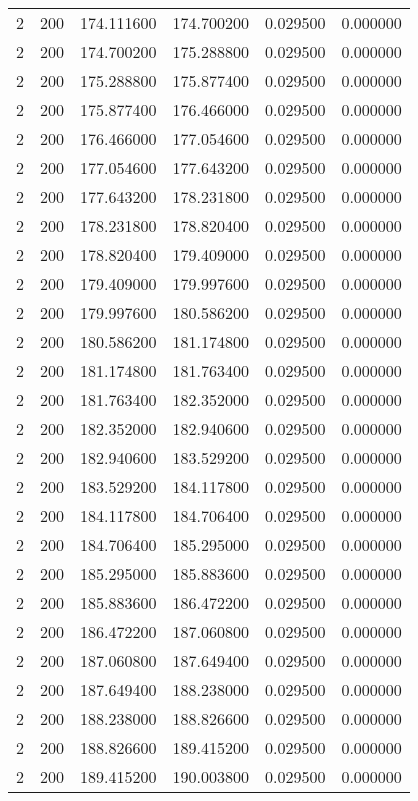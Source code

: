 \begin{longtable}{rrrrrr}
2 & 200 & 174.111600 & 174.700200 & 0.029500 & 0.000000 \\
2 & 200 & 174.700200 & 175.288800 & 0.029500 & 0.000000 \\
2 & 200 & 175.288800 & 175.877400 & 0.029500 & 0.000000 \\
2 & 200 & 175.877400 & 176.466000 & 0.029500 & 0.000000 \\
2 & 200 & 176.466000 & 177.054600 & 0.029500 & 0.000000 \\
2 & 200 & 177.054600 & 177.643200 & 0.029500 & 0.000000 \\
2 & 200 & 177.643200 & 178.231800 & 0.029500 & 0.000000 \\
2 & 200 & 178.231800 & 178.820400 & 0.029500 & 0.000000 \\
2 & 200 & 178.820400 & 179.409000 & 0.029500 & 0.000000 \\
2 & 200 & 179.409000 & 179.997600 & 0.029500 & 0.000000 \\
2 & 200 & 179.997600 & 180.586200 & 0.029500 & 0.000000 \\
2 & 200 & 180.586200 & 181.174800 & 0.029500 & 0.000000 \\
2 & 200 & 181.174800 & 181.763400 & 0.029500 & 0.000000 \\
2 & 200 & 181.763400 & 182.352000 & 0.029500 & 0.000000 \\
2 & 200 & 182.352000 & 182.940600 & 0.029500 & 0.000000 \\
2 & 200 & 182.940600 & 183.529200 & 0.029500 & 0.000000 \\
2 & 200 & 183.529200 & 184.117800 & 0.029500 & 0.000000 \\
2 & 200 & 184.117800 & 184.706400 & 0.029500 & 0.000000 \\
2 & 200 & 184.706400 & 185.295000 & 0.029500 & 0.000000 \\
2 & 200 & 185.295000 & 185.883600 & 0.029500 & 0.000000 \\
2 & 200 & 185.883600 & 186.472200 & 0.029500 & 0.000000 \\
2 & 200 & 186.472200 & 187.060800 & 0.029500 & 0.000000 \\
2 & 200 & 187.060800 & 187.649400 & 0.029500 & 0.000000 \\
2 & 200 & 187.649400 & 188.238000 & 0.029500 & 0.000000 \\
2 & 200 & 188.238000 & 188.826600 & 0.029500 & 0.000000 \\
2 & 200 & 188.826600 & 189.415200 & 0.029500 & 0.000000 \\
2 & 200 & 189.415200 & 190.003800 & 0.029500 & 0.000000 \\

\end{longtable}
